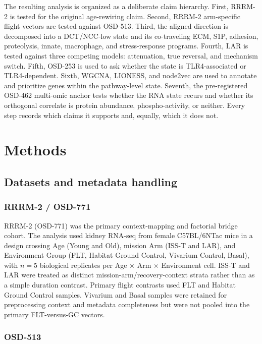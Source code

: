 \documentclass[11pt]{article}
\begin{document}
The resulting analysis is organized as a deliberate claim hierarchy. First, RRRM-2 is tested for the original age-rewiring claim. Second, RRRM-2 arm-specific flight vectors are tested against OSD-513. Third, the aligned direction is decomposed into a DCT/NCC-low state and its co-traveling ECM, S1P, adhesion, proteolysis, innate, macrophage, and stress-response programs. Fourth, LAR is tested against three competing models: attenuation, true reversal, and mechanism switch. Fifth, OSD-253 is used to ask whether the state is TLR4-associated or TLR4-dependent. Sixth, WGCNA, LIONESS, and node2vec are used to annotate and prioritize genes within the pathway-level state. Seventh, the pre-registered OSD-462 multi-omic anchor tests whether the RNA state recurs and whether its orthogonal correlate is protein abundance, phospho-activity, or neither. Every step records which claims it supports and, equally, which it does not.

\section{Methods}

\subsection{Datasets and metadata handling}

\subsubsection{RRRM-2 / OSD-771}

RRRM-2 (OSD-771) was the primary context-mapping and factorial bridge cohort. The analysis used kidney RNA-seq from female C57BL/6NTac mice in a design crossing Age (Young and Old), mission Arm (ISS-T and LAR), and Environment Group (FLT, Habitat Ground Control, Vivarium Control, Basal), with $n=5$ biological replicates per Age $\times$ Arm $\times$ Environment cell. ISS-T and LAR were treated as distinct mission-arm/recovery-context strata rather than as a simple duration contrast. Primary flight contrasts used FLT and Habitat Ground Control samples. Vivarium and Basal samples were retained for preprocessing context and metadata completeness but were not pooled into the primary FLT-versus-GC vectors.

\subsubsection{OSD-513}
\end{document}
